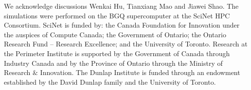 We acknowledge discussions Wenkai Hu, Tianxiang Mao and Jiawei Shao.
The simulations were performed on the BGQ supercomputer 
at the SciNet HPC Consortium.
SciNet is funded by: the Canada Foundation for Innovation under the auspices 
of Compute Canada;
the Government of Ontario; the Ontario Research Fund -- Research Excellence;
and the University of Toronto.
Research at the Perimeter Institute is supported by the Government of Canada through Industry Canada and by the 
Province of Ontario through the Ministry of Research $\&$ Innovation. 
The Dunlap Institute is funded through an endowment
established by the David Dunlap family and the University of Toronto.
